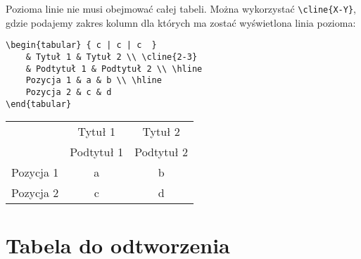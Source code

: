\documentclass[10pt,a4paper]{article}
\begin{document}
Pozioma linie nie musi obejmować całej tabeli. Można wykorzystać \lstinline|\cline{X-Y}|, gdzie podajemy zakres kolumn dla których ma zostać wyświetlona linia pozioma:

\begin{lstlisting}
\begin{tabular} { c | c | c  }
	& Tytuł 1 & Tytuł 2 \\ \cline{2-3}
	& Podtytuł 1 & Podtytuł 2 \\ \hline
	Pozycja 1 & a & b \\ \hline
	Pozycja 2 & c & d
\end{tabular}
\end{lstlisting}

\begin{tabular} { c | c | c  }
	& Tytuł 1 & Tytuł 2 \\ \cline{2-3}
	& Podtytuł 1 & Podtytuł 2 \\ \hline
	Pozycja 1 & a & b \\ \hline
	Pozycja 2 & c & d
\end{tabular}

\section{Tabela do odtworzenia}
\end{document}
